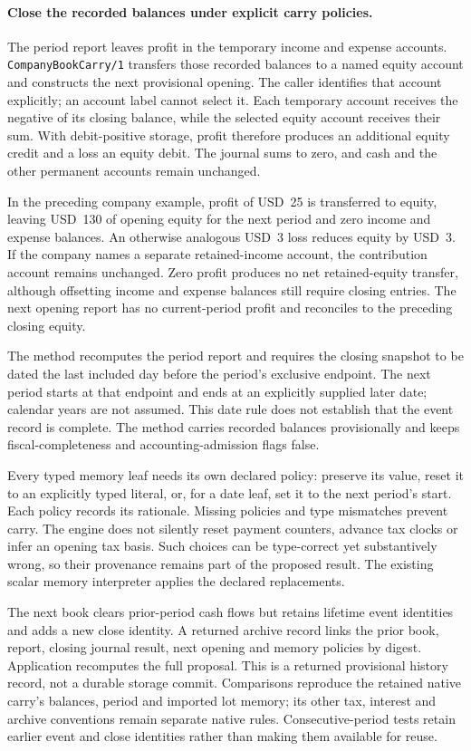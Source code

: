 \paragraph{Close the recorded balances under explicit carry policies.}
The period report leaves profit in the temporary income and expense accounts.
\texttt{CompanyBookCarry/1} transfers those recorded balances to a named equity
account and constructs the next provisional opening. The caller identifies that
account explicitly; an account label cannot select it. Each temporary account
receives the negative of its closing balance, while the selected equity account
receives their sum. With debit-positive storage, profit therefore produces an
additional equity credit and a loss an equity debit. The journal sums to zero,
and cash and the other permanent accounts remain unchanged.

In the preceding company example, profit of USD~25 is transferred to equity,
leaving USD~130 of opening equity for the next period and zero income and expense
balances. An otherwise analogous USD~3 loss reduces equity by USD~3. If the
company names a separate retained-income account, the contribution account remains
unchanged. Zero profit produces no net retained-equity transfer, although offsetting
income and expense balances still require closing entries. The next opening report
has no current-period profit and reconciles to the preceding closing equity.

The method recomputes the period report and requires the closing snapshot to be
dated the last included day before the period's exclusive endpoint. The next
period starts at that endpoint and ends at an explicitly supplied later date;
calendar years are not assumed. This date rule does not establish that the event
record is complete. The method carries recorded balances provisionally and keeps
fiscal-completeness and accounting-admission flags false.

Every typed memory leaf needs its own declared policy: preserve its value, reset
it to an explicitly typed literal, or, for a date leaf, set it to the next period's
start. Each policy records its rationale. Missing policies and type mismatches
prevent carry. The engine does not silently reset payment counters, advance tax
clocks or infer an opening tax basis. Such choices can be type-correct yet
substantively wrong, so their provenance remains part of the proposed result.
The existing scalar memory interpreter applies the declared replacements.

The next book clears prior-period cash flows but retains lifetime event identities
and adds a new close identity. A returned archive record links the prior book,
report, closing journal result, next opening and memory policies by digest.
Application recomputes the full proposal. This is a returned provisional history
record, not a durable storage commit. Comparisons reproduce the retained native
carry's balances, period and imported lot memory; its other tax, interest and
archive conventions remain separate native rules. Consecutive-period tests retain
earlier event and close identities rather than making them available for reuse.

